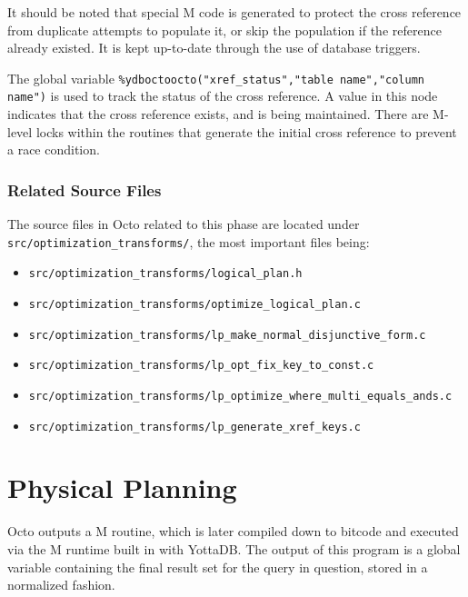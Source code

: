 \documentclass[]{article}
\def\code#1{\texttt{#1}}
\begin{document}


It should be noted that special M code is generated to protect the cross reference from duplicate attempts to populate it, or skip the population if the reference already existed.
It is kept up-to-date through the use of database triggers.

The global variable \code{\%ydboctoocto("xref\_status","table name","column name")} is used to track the status of the cross reference.
A value in this node indicates that the cross reference exists, and is being maintained.
There are M-level locks within the routines that generate the initial cross reference to prevent a race condition.

\subsubsection{Related Source Files}

The source files in Octo related to this phase are located under \code{src/optimization\_transforms/}, the most important files being:

\begin{itemize}
	\item \code{src/optimization\_transforms/logical\_plan.h}
	\item \code{src/optimization\_transforms/optimize\_logical\_plan.c}
	\item \code{src/optimization\_transforms/lp\_make\_normal\_disjunctive\_form.c}
	\item \code{src/optimization\_transforms/lp\_opt\_fix\_key\_to\_const.c}
	\item \code{src/optimization\_transforms/lp\_optimize\_where\_multi\_equals\_ands.c}
	\item \code{src/optimization\_transforms/lp\_generate\_xref\_keys.c}
\end{itemize}

\section{Physical Planning} \label{sec:physical}

Octo outputs a M routine, which is later compiled down to bitcode and executed via the M runtime built in with YottaDB.
The output of this program is a global variable containing the final result set for the query in question, stored in a normalized fashion.
\end{document}
